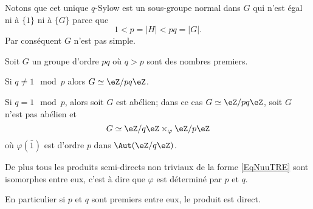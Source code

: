 Notons que cet unique \( q\)-Sylow est un sous-groupe normal dans \( G\) qui n'est égal ni à \( \{ 1 \}\) ni à \( \{ G \}\) parce que
\begin{equation}
    1<p=| H |<pq=| G |.
\end{equation}
Par conséquent \( G\) n'est pas simple.

\begin{theorem} \label{ThoLnTMBy}
    Soit \( G\) un groupe d'ordre \( pq\) où \( q>p\) sont des nombres premiers.

    Si \( q\neq 1\mod p\) alors \( G\simeq \eZ/pq\eZ\).

    Si \( q=1\mod p\), alors soit \( G\) est abélien; dans ce cas \( G\simeq \eZ/pq\eZ\), soit \( G\) n'est pas abélien et
    \begin{equation}    \label{EqNuuTRE}
        G\simeq \eZ/q\eZ\times_{\varphi}\eZ/p\eZ
    \end{equation}
    où \( \varphi(\bar 1)\) est d'ordre \( p\) dans \( \Aut(\eZ/q\eZ)\).

    De plus tous les produits semi-directs non triviaux de la forme \eqref{EqNuuTRE} sont isomorphes entre eux, c'est à dire que \( \varphi\) est déterminé par \( p\) et \( q\).

    En particulier si \( p\) et \( q\) sont premiers entre eux, le produit est direct.
\end{theorem}

